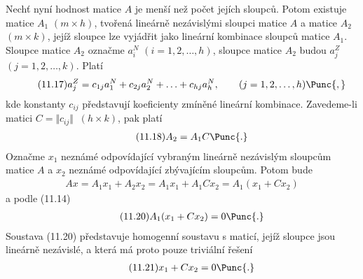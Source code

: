 Nechť  nyní hodnost matice $A$ je menší než počet jejích
sloupců. Potom existuje matice $A_1$ $(m \times h)$, tvořená lineárně
nezávislými sloupci matice $A$ a matice $A_2$ $(m \times k)$, jejíž
sloupce lze vyjádřit jako lineární kombinace sloupců matice
$A_1$. Sloupce matice $A_2$ označme $a_i^N$ $(i=1,2,\ldots,h)$,
sloupce matice $A_2$ budou $a_j^Z$ $(j=1,2,\ldots,k)$. Platí
%
\begin{align*}
  \tag{11.17}
  a_j^Z = c_{1j}a_1^N + c_{2j}a_2^N + \ldots + c_{hj}a_h^N, \qquad
          (j=1,2,\ldots,h) \Punc{,}
\end{align*}
%
kde konstanty $c_{ij}$ představují koeficienty zmíněné lineární
kombinace. Zavedeme-li matici $C = \Vert c_{ij} \Vert \;\; (h \times k)$,
pak platí
\begin{align*}
  \tag{11.18}
  A_2 = A_1C \Punc{.}
\end{align*}
%
Označme $x_1$ neznámé odpovídající vybraným lineárně nezávislým
sloupcům matice $A$ a $x_2$ neznámé odpovídající zbývajícím sloupcům.
Potom bude
%
\begin{align*}
  \tag{11.19}
  Ax = A_1x_1 + A_2x_2 = A_1x_1 + A_1Cx_2 = A_1(x_1 + Cx_2)
\end{align*}
%
a podle (11.14)
%
\begin{align*}
  \tag{11.20}
  A_1(x_1 + Cx_2) = 0 \Punc{.}
\end{align*}
%
Soustava (11.20) představuje homogenní soustavu s maticí, jejíž
sloupce jsou lineárně nezávislé, a která má proto pouze
triviální řešení
\begin{align*}
  \tag{11.21}
  x_1 + Cx_2 = 0 \Punc{.}
\end{align*}
%

